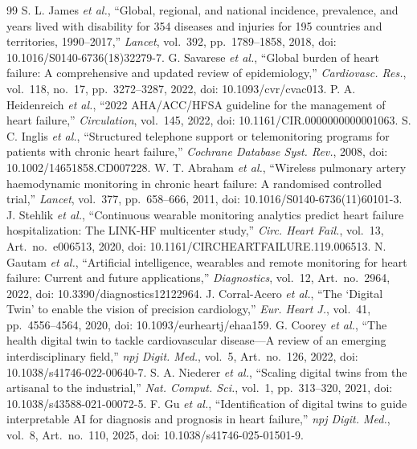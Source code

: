 \documentclass[conference]{IEEEtran}
\begin{document}
\begin{thebibliography}{99}
 S. L. James \textit{et al.}, ``Global, regional, and national incidence, prevalence, and years lived with disability for 354 diseases and injuries for 195 countries and territories, 1990--2017,'' \textit{Lancet}, vol.~392, pp.~1789--1858, 2018, doi: 10.1016/S0140-6736(18)32279-7.
 G. Savarese \textit{et al.}, ``Global burden of heart failure: A comprehensive and updated review of epidemiology,'' \textit{Cardiovasc. Res.}, vol.~118, no.~17, pp.~3272--3287, 2022, doi: 10.1093/cvr/cvac013.
 P. A. Heidenreich \textit{et al.}, ``2022 AHA/ACC/HFSA guideline for the management of heart failure,'' \textit{Circulation}, vol.~145, 2022, doi: 10.1161/CIR.0000000000001063.
 S. C. Inglis \textit{et al.}, ``Structured telephone support or telemonitoring programs for patients with chronic heart failure,'' \textit{Cochrane Database Syst. Rev.}, 2008, doi: 10.1002/14651858.CD007228.
 W. T. Abraham \textit{et al.}, ``Wireless pulmonary artery haemodynamic monitoring in chronic heart failure: A randomised controlled trial,'' \textit{Lancet}, vol.~377, pp.~658--666, 2011, doi: 10.1016/S0140-6736(11)60101-3.
 J. Stehlik \textit{et al.}, ``Continuous wearable monitoring analytics predict heart failure hospitalization: The LINK-HF multicenter study,'' \textit{Circ. Heart Fail.}, vol.~13, Art.~no.~e006513, 2020, doi: 10.1161/CIRCHEARTFAILURE.119.006513.
 N. Gautam \textit{et al.}, ``Artificial intelligence, wearables and remote monitoring for heart failure: Current and future applications,'' \textit{Diagnostics}, vol.~12, Art.~no.~2964, 2022, doi: 10.3390/diagnostics12122964.
 J. Corral-Acero \textit{et al.}, ``The `Digital Twin' to enable the vision of precision cardiology,'' \textit{Eur. Heart J.}, vol.~41, pp.~4556--4564, 2020, doi: 10.1093/eurheartj/ehaa159.
 G. Coorey \textit{et al.}, ``The health digital twin to tackle cardiovascular disease---A review of an emerging interdisciplinary field,'' \textit{npj Digit. Med.}, vol.~5, Art.~no.~126, 2022, doi: 10.1038/s41746-022-00640-7.
 S. A. Niederer \textit{et al.}, ``Scaling digital twins from the artisanal to the industrial,'' \textit{Nat. Comput. Sci.}, vol.~1, pp.~313--320, 2021, doi: 10.1038/s43588-021-00072-5.
 F. Gu \textit{et al.}, ``Identification of digital twins to guide interpretable AI for diagnosis and prognosis in heart failure,'' \textit{npj Digit. Med.}, vol.~8, Art.~no.~110, 2025, doi: 10.1038/s41746-025-01501-9.

\end{thebibliography}
\end{document}
